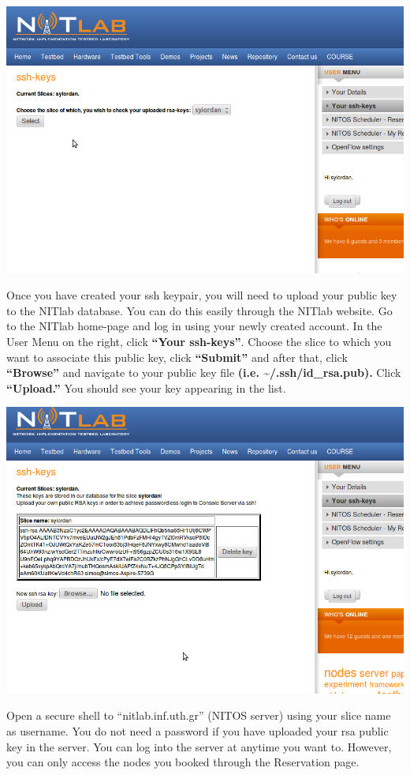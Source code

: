 \documentclass[letterpaper,10pt,english]{sphinxmanual}
\begin{document}
\includegraphics{ssh_key.png}

Once you have created your ssh keypair, you will need to upload your public key to the NITlab database. You can do this easily through the NITlab website. Go to the NITlab home-page and log in using your newly created account. In the User Menu on the right, click \textbf{“Your ssh-keys”}. Choose the slice to which you want to associate this public key, click \textbf{``Submit''} and after that, click \textbf{“Browse”} and navigate to your public key file \textbf{(i.e. \textasciitilde{}/.ssh/id\_rsa.pub).} Click \textbf{“Upload.”} You should see your key appearing in the list.

\includegraphics{ssh_key2.png}

Open a secure shell to ``nitlab.inf.uth.gr'' (NITOS server) using your slice name as username. You do not need a password if you have uploaded your rsa public key in the server. You can log into the server at anytime you want to. However, you can only access the nodes you booked through the Reservation page.
\end{document}
